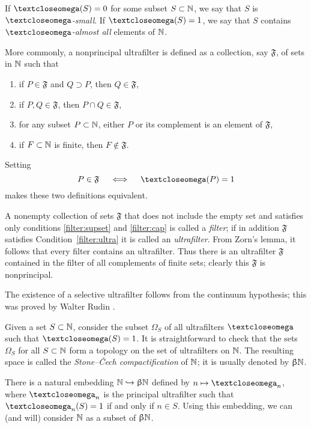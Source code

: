 If $\o(S)=0$ for some subset $S\subset \NN$,
we say that $S$ is \emph{$\o$-small}. 
If $\o(S)=1$, we say that $S$ contains \emph{$\o$-almost all} elements of $\mathbb{N}$.

More commonly, a nonprincipal ultrafilter is defined as a collection, say $\mathfrak{F}$, of sets in $\mathbb{N}$ such that
\begin{enumerate}
\item\label{filter:supset} if $P\in \mathfrak{F}$ and $Q\supset P$, then $Q\in \mathfrak{F}$,
\item\label{filter:cap} if $P, Q\in \mathfrak{F}$, then $P\cap Q\in \mathfrak{F}$,
\item\label{filter:ultra} for any subset $P\subset\NN$, either $P$ or its complement is an element of $\mathfrak{F}$,
\item\label{filter:non-prin} if $F\subset \NN $ is finite, then $F\notin \mathfrak{F}$.
\end{enumerate}

Setting 
\[P\in\mathfrak{F}\quad\iff\quad\o(P)=1\] 
makes these two definitions equivalent.

A nonempty collection of sets $\mathfrak{F}$ that does not include the empty set and satisfies only conditions \ref{filter:supset} and \ref{filter:cap} is called a \emph{filter}; 
if in addition $\mathfrak{F}$ satisfies Condition~\ref{filter:ultra} it is called an \emph{ultrafilter}.
From Zorn's lemma, it follows that every filter contains an ultrafilter.
Thus there is an ultrafilter $\mathfrak{F}$ contained in the filter of all complements of finite sets; clearly this $\mathfrak{F}$ is nonprincipal.

The existence of a selective ultrafilter follows from the continuum hypothesis;
this was proved by Walter Rudin \cite{rudin}.

Given a set $S\subset \NN$, consider the subset $\Omega_S$ of all ultrafilters $\o$ such that $\o(S)=1$.
It is straightforward to check that the sets $\Omega_S$ for all $S\subset \NN$ form a topology on the set of ultrafilters on $\mathbb{N}$. 
The resulting space is called the \emph{Stone--\v{C}ech compactification} of $\mathbb{N}$; it is usually denoted by $\upbeta\mathbb{N}$.

There is a natural embedding $\NN\hookrightarrow\beta\NN$ defined by 
$n\mapsto\o_n$, where $\o_n$ is the principal ultrafilter such that $\o_n(S)=1$ if and only if $n\in S$. 
Using this embedding, we can (and will) consider $\mathbb{N}$ as a subset of $\upbeta\mathbb{N}$.

